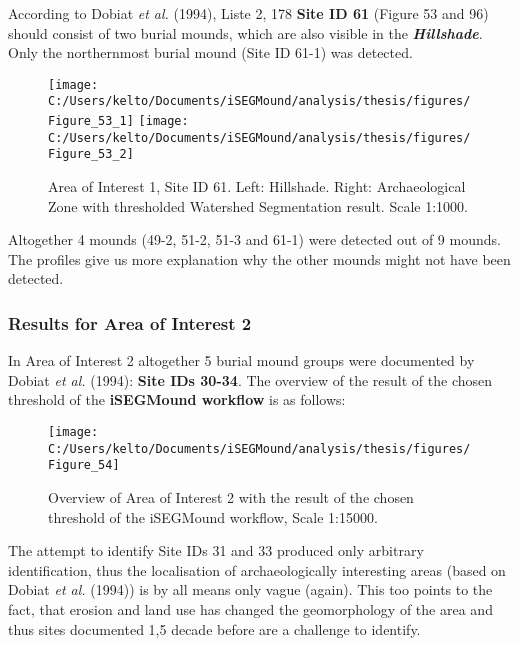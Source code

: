 \documentclass[
  12pt,
]{article}
\begin{document}
According to Dobiat \emph{et al.} (1994), Liste 2, 178 \textbf{Site ID 61} (Figure 53 and 96) should consist of two burial mounds, which are also visible in the \textbf{\emph{Hillshade}}. Only the northernmost burial mound (Site ID 61-1) was detected.

\begin{figure}
\texttt{[image: C:/Users/kelto/Documents/iSEGMound/analysis/thesis/figures/Figure\_53\_1]} \texttt{[image: C:/Users/kelto/Documents/iSEGMound/analysis/thesis/figures/Figure\_53\_2]} \caption{Area of Interest 1, Site ID 61. Left: Hillshade. Right: Archaeological Zone with thresholded Watershed Segmentation result. Scale 1:1000.}\label{fig:Figure53}
\end{figure}

Altogether 4 mounds (49-2, 51-2, 51-3 and 61-1) were detected out of 9 mounds. The profiles give us more explanation why the other mounds might not have been detected.

\hypertarget{results-for-area-of-interest-2}{%
\subsubsection{\texorpdfstring{\textbf{Results for Area of Interest 2}}{Results for Area of Interest 2}}\label{results-for-area-of-interest-2}}

In Area of Interest 2 altogether 5 burial mound groups were documented by Dobiat \emph{et al.} (1994): \textbf{Site IDs 30-34}.
The overview of the result of the chosen threshold of the \textbf{iSEGMound workflow} is as follows:

\begin{figure}

{\centering \texttt{[image: C:/Users/kelto/Documents/iSEGMound/analysis/thesis/figures/Figure\_54]} 

}

\caption{Overview of Area of Interest 2 with the result of the chosen threshold of the iSEGMound workflow, Scale 1:15000.}\label{fig:Figure54}
\end{figure}

The attempt to identify Site IDs 31 and 33 produced only arbitrary identification, thus the localisation of archaeologically interesting areas (based on Dobiat \emph{et al.} (1994)) is by all means only vague (again). This too points to the fact, that erosion and land use has changed the geomorphology of the area and thus sites documented 1,5 decade before are a challenge to identify.
\end{document}
